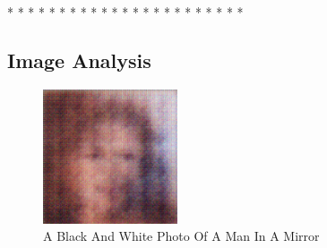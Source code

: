 \documentclass{article}%
\begin{document}
*\newline%
*\newline%
*\newline%
*\newline%
*\newline%
*\newline%
*\newline%
*\newline%
*\newline%
*\newline%
*\newline%
*\newline%
*\newline%
*\newline%
*\newline%
*\newline%
*\newline%
*\newline%
*\newline%
*\newline%
*\newline%
*\newline%
*

%
\subsection{Image Analysis}%
\label{subsec:ImageAnalysis}%


\begin{figure}[h!]%
\centering%
\includegraphics[width=150px]{500_fake_images/samples_5_58.png}%
\caption{A Black And White Photo Of A Man In A Mirror}%
\end{figure}

%
\end{document}
